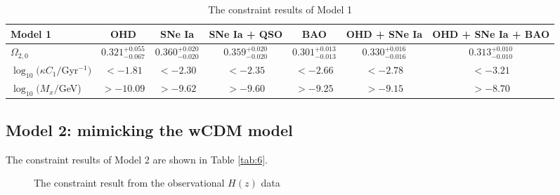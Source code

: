 \documentclass[twocolumn]{aastex631}
\begin{document}
   \begin{table}[htbp]
      \caption{The constraint results of Model 1}
      \centering
      \begin{tabular}{lcccccc}
         \hline\hline
         Model 1 & OHD & SNe Ia & SNe Ia + QSO & BAO &
          OHD + SNe Ia & OHD + SNe Ia + BAO \\
         \hline
         $\Omega_{2,0}$ & $0.321_{-0.067}^{+0.055}$ & $0.360_{-0.020}^{+0.020}$
          & $0.359_{-0.020}^{+0.020}$ & $0.301_{-0.013}^{+0.013}$
          & $0.330_{-0.016}^{+0.016}$ & $0.313_{-0.010}^{+0.010}$ \\
         $\log_{10}(\kappa C_1/$Gyr${}^{-1})$ & $<-1.81$ & $<-2.30$ & $<-2.35$
          & $<-2.66$ & $<-2.78$ & $<-3.21$ \\
         $\log_{10}(M_x/$GeV) & $>-10.09$ & $>-9.62$ & $>-9.60$
          & $>-9.25$ & $>-9.15$ & $>-8.70$ \\
         \hline
      \end{tabular}
      \label{tab:5}
   \end{table}

\subsection{Model 2: mimicking the wCDM model}

   The constraint results of Model 2 are shown in Table \ref{tab:6}.

   \begin{figure}[htbp]
      \centering
      \caption{The constraint result from the observational
      $H(z)$ data}
   \end{figure}
\end{document}
